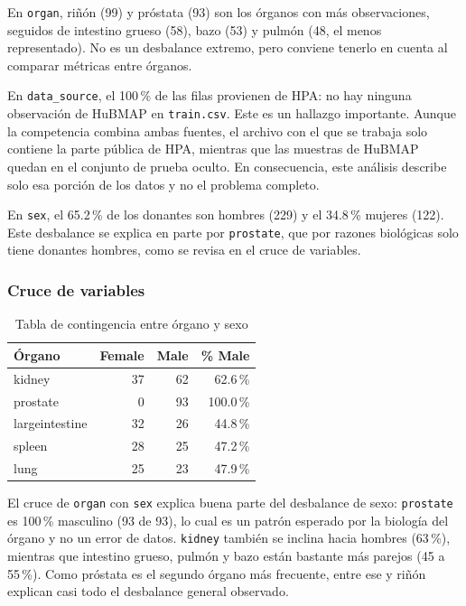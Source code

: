 \documentclass[11pt,letterpaper]{article}
\begin{document}
En \texttt{organ}, riñón (99) y próstata (93) son los órganos con más observaciones, seguidos de
intestino grueso (58), bazo (53) y pulmón (48, el menos representado). No es un desbalance extremo,
pero conviene tenerlo en cuenta al comparar métricas entre órganos.

En \texttt{data\_source}, el 100\,\% de las filas provienen de HPA: no hay ninguna observación de
HuBMAP en \texttt{train.csv}. Este es un hallazgo importante. Aunque la competencia combina ambas
fuentes, el archivo con el que se trabaja solo contiene la parte pública de HPA, mientras que las
muestras de HuBMAP quedan en el conjunto de prueba oculto. En consecuencia, este análisis describe
solo esa porción de los datos y no el problema completo.

En \texttt{sex}, el 65.2\,\% de los donantes son hombres (229) y el 34.8\,\% mujeres (122). Este
desbalance se explica en parte por \texttt{prostate}, que por razones biológicas solo tiene donantes
hombres, como se revisa en el cruce de variables.

\subsubsection{Cruce de variables}

\begin{table}[H]
\centering
\caption{Tabla de contingencia entre órgano y sexo}
\begin{tabular}{lrrr}
\toprule
\textbf{Órgano} & \textbf{Female} & \textbf{Male} & \textbf{\% Male} \\
\midrule
kidney         & 37 & 62 & 62.6\,\% \\
prostate       &  0 & 93 & 100.0\,\% \\
largeintestine & 32 & 26 & 44.8\,\% \\
spleen         & 28 & 25 & 47.2\,\% \\
lung           & 25 & 23 & 47.9\,\% \\
\bottomrule
\end{tabular}
\end{table}

El cruce de \texttt{organ} con \texttt{sex} explica buena parte del desbalance de sexo:
\texttt{prostate} es 100\,\% masculino (93 de 93), lo cual es un patrón esperado por la biología del
órgano y no un error de datos. \texttt{kidney} también se inclina hacia hombres (63\,\%), mientras
que intestino grueso, pulmón y bazo están bastante más parejos (45 a 55\,\%). Como próstata es el
segundo órgano más frecuente, entre ese y riñón explican casi todo el desbalance general observado.
\end{document}
